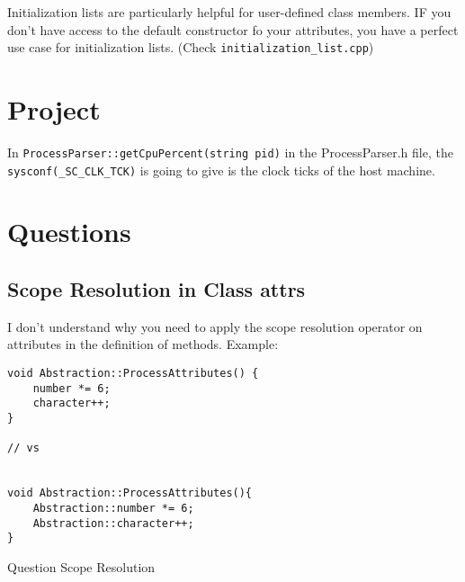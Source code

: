 \documentclass[11pt, a4paper]{article}
\begin{document}
Initialization lists are particularly helpful for user-defined class members. IF you don't have access to the default constructor fo your attributes, you have a perfect use case for initialization lists. (Check \texttt{initialization\_list.cpp})


\section{Project}%
\label{sec:project}

In \texttt{ProcessParser::getCpuPercent(string pid)} in the ProcessParser.h file, the \texttt{sysconf(\_SC\_CLK\_TCK)} is going to give is the clock ticks of the host machine.   































\section{Questions}%
\label{sec:questions}

\subsection{Scope Resolution in Class attrs}%
\label{sub:scoperes_class_attrs}

I don't understand why you need to apply the scope resolution operator on attributes in the definition of methods. Example:


\begin{listing}[hbt!]
\begin{verbatim}
void Abstraction::ProcessAttributes() {
    number *= 6;
    character++;
}

// vs


void Abstraction::ProcessAttributes(){
	Abstraction::number *= 6;
	Abstraction::character++;
}
\end{verbatim}
\caption{Question Scope Resolution}
\label{lst:question_scope_resolution}
\end{listing}
\end{document}
